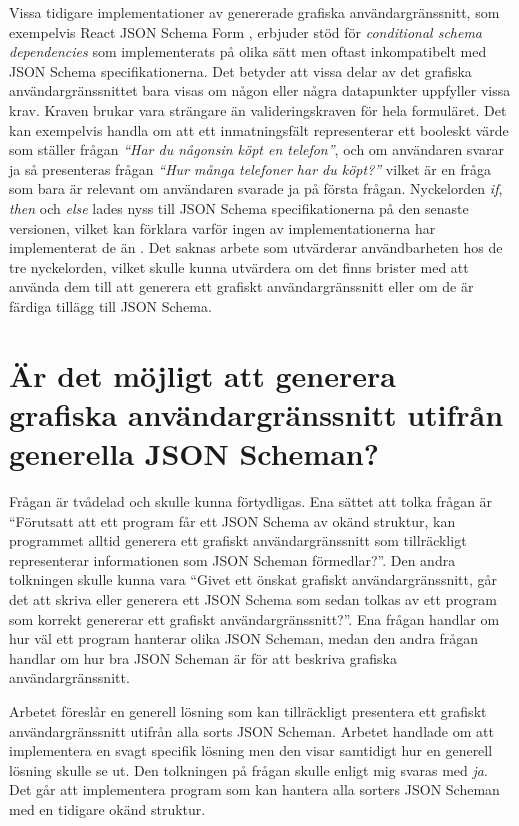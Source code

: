 Vissa tidigare implementationer av genererade grafiska användargränssnitt, som exempelvis React JSON Schema Form \cite{MozillaServices}, erbjuder stöd för \textit{conditional schema dependencies} som implementerats på olika sätt men oftast inkompatibelt med JSON Schema specifikationerna. Det betyder att vissa delar av det grafiska användargränssnittet bara visas om någon eller några datapunkter uppfyller vissa krav. Kraven brukar vara strängare än valideringskraven för hela formuläret. Det kan exempelvis handla om att ett inmatningsfält representerar ett booleskt värde som ställer frågan \textit{``Har du någonsin köpt en telefon''}, och om användaren svarar ja så presenteras frågan \textit{``Hur många telefoner har du köpt?''} vilket är en fråga som bara är relevant om användaren svarade ja på första frågan. Nyckelorden \textit{if}, \textit{then} och \textit{else} lades nyss till JSON Schema specifikationerna på den senaste versionen, vilket kan förklara varför ingen av implementationerna har implementerat de än \cite[s.~15-16,~28]{Andrews2018}. Det saknas arbete som utvärderar användbarheten hos de tre nyckelorden, vilket skulle kunna utvärdera om det finns brister med att använda dem till att generera ett grafiskt användargränssnitt eller om de är färdiga tillägg till JSON Schema.

\section{Är det möjligt att generera grafiska användargränssnitt utifrån generella JSON Scheman?}
\label{sec:slutsats:generera}
Frågan är tvådelad och skulle kunna förtydligas. Ena sättet att tolka frågan är ``Förutsatt att ett program får ett JSON Schema av okänd struktur, kan programmet alltid generera ett grafiskt användargränssnitt som tillräckligt representerar informationen som JSON Scheman förmedlar?''. Den andra tolkningen skulle kunna vara ``Givet ett önskat grafiskt användargränssnitt, går det att skriva eller generera ett JSON Schema som sedan tolkas av ett program som korrekt genererar ett grafiskt användargränssnitt?''. Ena frågan handlar om hur väl ett program hanterar olika JSON Scheman, medan den andra frågan handlar om hur bra JSON Scheman är för att beskriva grafiska användargränssnitt.

Arbetet föreslår en generell lösning som kan tillräckligt presentera ett grafiskt användargränssnitt utifrån alla sorts JSON Scheman. Arbetet handlade om att implementera en svagt specifik lösning men den visar samtidigt hur en generell lösning skulle se ut. Den tolkningen på frågan skulle enligt mig svaras med \textit{ja}. Det går att implementera program som kan hantera alla sorters JSON Scheman med en tidigare okänd struktur.

